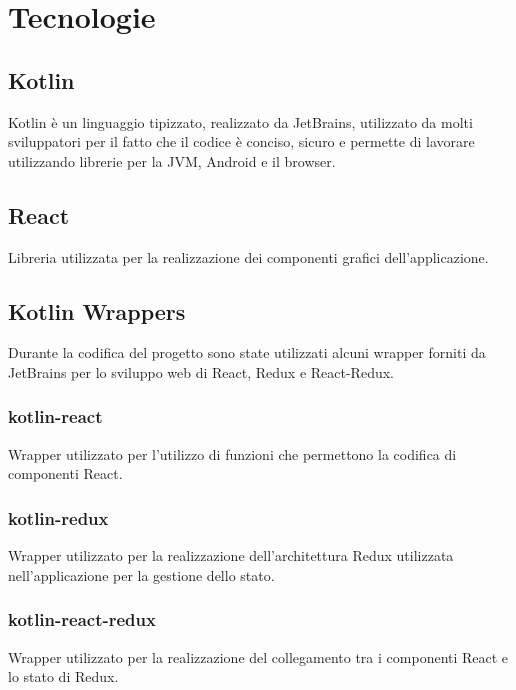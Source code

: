 
\chapter{Tecnologie}
\label{cap:tecnologie-strumenti}


\section{Kotlin}
Kotlin è un linguaggio tipizzato, realizzato da JetBrains, utilizzato da molti sviluppatori per il fatto che il codice è conciso, sicuro e permette di lavorare utilizzando librerie per la JVM, Android e il browser.

\section{React}
Libreria utilizzata per la realizzazione dei componenti grafici dell'applicazione.

\section{Kotlin Wrappers}
Durante la codifica del progetto sono state utilizzati alcuni wrapper forniti da JetBrains per lo sviluppo web di React, Redux e React-Redux.

\subsection{kotlin-react}
Wrapper utilizzato per l'utilizzo di funzioni che permettono la codifica di componenti React.

\subsection{kotlin-redux}
Wrapper utilizzato per la realizzazione dell'architettura Redux utilizzata nell'applicazione per la gestione dello stato.

\subsection{kotlin-react-redux}
Wrapper utilizzato per la realizzazione del collegamento tra i componenti React e lo stato di Redux.

